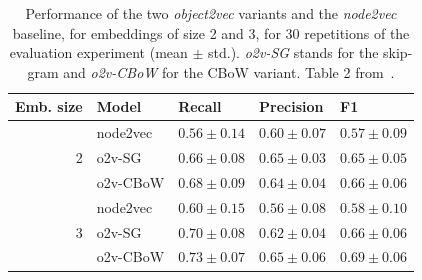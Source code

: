 \begin{table}
    \centering
    \begin{tabular}{rllll}
    \toprule
    Emb. size & Model & Recall & Precision & F1\\
    \midrule
    \multirow{3}{*}{2} & node2vec & $0.56\pm0.14$ & $0.60\pm0.07$ & $0.57\pm0.09$ \\
    & o2v-SG & $0.66\pm0.08$ & $0.65\pm0.03$ & $0.65\pm0.05$ \\
    & o2v-CBoW & $0.68\pm0.09$ & $0.64\pm0.04$ & $0.66\pm0.06$ \\
    \midrule
    \multirow{3}{*}{3} & node2vec & $0.60\pm0.15$ & $0.56\pm0.08$ & $0.58\pm0.10$ \\
    & o2v-SG & $0.70\pm0.08$ & $0.62\pm0.04$ & $0.66\pm0.06$ \\
    & o2v-CBoW & $0.73\pm0.07$ & $0.65\pm0.06$ & $0.69\pm0.06$ \\
    \bottomrule
    \end{tabular}
    \caption{Performance of the two \textit{object2vec} variants and the \textit{node2vec} baseline, for embeddings of size 2 and 3, for 30 repetitions of the evaluation experiment (mean $\pm$ std.). \textit{o2v-SG} stands for the skip-gram and \textit{o2v-CBoW} for the CBoW variant. Table 2 from~\cite{fca2vec:2019:durrschnabel}.}
    \label{tab:fca2vec-o2v-perf}
\end{table}









